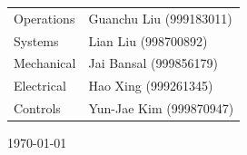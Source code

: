 \begin{titlepage}
\begin{centering} \large
\begin{tabular}{ll}
Operations	&	Guanchu Liu (999183011)	\\
Systems		&	Lian Liu (998700892)	\\
Mechanical	&	Jai Bansal (999856179)	\\
Electrical	& 	Hao Xing (999261345)	\\
Controls	&	Yun-Jae Kim (999870947)	\\[1cm]
\end{tabular}
\end{centering}




{\large \today}\\[3cm] %
 

\vfill %

\end{titlepage}
